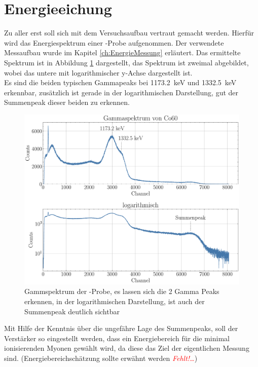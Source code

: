 \documentclass[12pt,a4paper,ngerman]{report}
\providecommand{\fehlt}{\textcolor{red}{\emph{Fehlt!\dots}}}
\begin{document}
	\section{Energieeichung}
		Zu aller erst soll sich mit dem Versuchsaufbau vertraut gemacht werden. Hierfür wird das Energiespektrum einer -Probe aufgenommen. Der verwendete Messaufbau wurde im Kapitel \ref{ch:EnergieMessung} erläutert. Das ermittelte Spektrum ist in Abbildung \ref{img:GammaCo60} dargestellt, das Spektrum ist zweimal abgebildet, wobei das untere mit logarithmischer y-Achse dargestellt ist.\\
		Es sind die beiden typischen Gammapeaks bei \SI{1173.2}{\kilo \eV} und \SI{1332.5}{\kilo \eV} erkennbar, zusätzlich ist gerade in der logarithmischen Darstellung, gut der Summenpeak dieser beiden zu erkennen. 
		\begin{figure}[ht]
			\centering
			\includegraphics[width=\textwidth]{Bilder/GammaCo60.pdf}		
			\caption{Gammspektrum der -Probe, es lassen sich die 2 Gamma Peaks erkennen, in der logarithmischen Darstellung, ist auch der Summenpeak deutlich sichtbar}
			\label{img:GammaCo60}
		\end{figure}
	Mit Hilfe der Kenntnis über die ungefähre Lage des Summenpeaks, soll der Verstärker so eingestellt werden, dass ein Energiebereich für die minimal ionisierenden
	Myonen gewählt wird, da diese das Ziel der eigentlichen Messung sind. (Energiebereichschätzung sollte erwähnt werden \fehlt)
\end{document}
